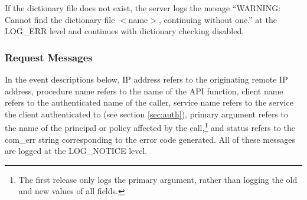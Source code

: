 If the dictionary file does not exist, the server logs the mesage
``WARNING: Cannot find the dictionary file $<$name$>$, continuing
without one.'' at the LOG_ERR level and continues with dictionary
checking disabled.

\subsubsection{Request Messages}

In the event descriptions below, IP address refers to the originating
remote IP address, procedure name refers to the name of the API
function, client name refers to the authenticated name of the caller,
service name refers to the service the client authenticated to (see
section \ref{sec:auth}), primary argument refers to the name of the
principal or policy affected by the call,\footnote{The first release
only logs the primary argument, rather than logging the old and new
values of all fields.} and status refers to the com_err string
corresponding to the error code generated.  All of these messages are
logged at the LOG_NOTICE level.

